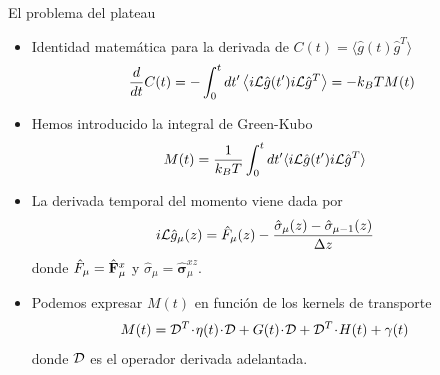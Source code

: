 \documentclass{beamer}
\newcommand{\esc}{\!\cdot\!}
\newcommand{\llangle}{\left\langle}
\newcommand{\rrangle}{\right\rangle}
\begin{document}
\begin{frame}{El problema del plateau}
  \begin{itemize}
    \item<1-> Identidad matemática para la derivada de $C(t)=\langle\hat{g}(t)\hat{g}^T\rangle$
\begin{align}
  \frac{d}{dt}C(t)
=-  \int_0^t dt' \llangle i{\cal L}\hat{g}(t') i{\cal L}\hat{g}^T\rrangle
=-  k_BT M(t)
\nonumber
\end{align}
\item<2-> Hemos introducido la integral de Green-Kubo 
\begin{align}
M(t)&= \frac{1}{k_BT}\int_0^t dt'\langle i{\cal L}\hat{g}(t')i{\cal L} \hat{g}^T\rangle
\nonumber
\end{align}
\item<3-> La derivada temporal del momento viene dada por
\begin{align}
  i{\cal L}\hat{g}_\mu(z) &=\hat{F}_\mu(z)-\frac{\hat{\sigma}_\mu(z)-\hat{\sigma}_{\mu-1}(z)}{\Delta z}
\nonumber
\end{align}
donde
$\hat{F}_\mu=\hat{\bf                   F}_\mu^x$                  y
$\hat{\sigma}_\mu=\hat{\boldsymbol{\sigma}}^{xz}_\mu$.
\item<4-> Podemos expresar $M(t)$ en función de los kernels de transporte 
\begin{align}
  {M}(t)&={\cal D}^T\esc{\eta}(t)\esc {\cal D}+{G}(t)\esc {\cal D}+{\cal D}^T\esc{H}(t)+{\gamma}(t)
\nonumber
\end{align}
donde ${\cal D}$ es el operador derivada adelantada. 
  \end{itemize}
\end{frame}

\end{document}
